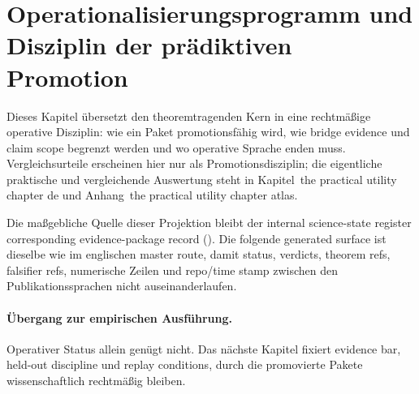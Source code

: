 \section{Operationalisierungsprogramm und Disziplin der prädiktiven Promotion}
\label{sec:oc-core-1-3-operationalization-program-de}

Dieses Kapitel übersetzt den theoremtragenden Kern in eine rechtmäßige
operative Disziplin: wie ein Paket promotionsfähig wird, wie bridge evidence
und claim scope begrenzt werden und wo operative Sprache enden muss.
Vergleichsurteile erscheinen hier nur als Promotionsdisziplin; die eigentliche
praktische und vergleichende Auswertung steht in
Kapitel~the practical utility chapter de und
Anhang~the practical utility chapter atlas.

Die maßgebliche Quelle dieser Projektion bleibt der internal science-state register
corresponding evidence-package record
(). Die folgende generated surface ist
dieselbe wie im englischen master route, damit status, verdicts, theorem refs,
falsifier refs, numerische Zeilen und repo/time stamp zwischen den
Publikationssprachen nicht auseinanderlaufen.

\begingroup
\small

\endgroup

\paragraph{Übergang zur empirischen Ausführung.}
Operativer Status allein genügt nicht. Das nächste Kapitel fixiert evidence
bar, held-out discipline und replay conditions, durch die promovierte Pakete
wissenschaftlich rechtmäßig bleiben.
